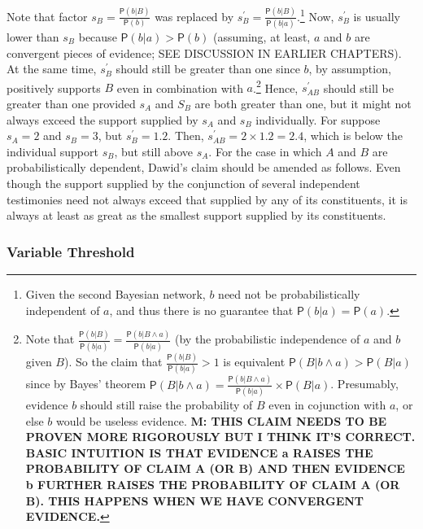 \documentclass[10pt,dvipsnames,enabledeprecatedfontcommands]{scrartcl}
\newcommand{\pr}[1]{\mathsf{P}(#1)}
\begin{document}
\noindent  Note that factor \(s_{B}= \frac{\pr{b |B}}{\pr{b}}\) was
replaced by
\(s^{'}_{B}=\frac{\pr{b |B}}{\pr{b|a}}\).\footnote{Given the second Bayesian network, 
$b$ need not be probabilistically independent of $a$, and thus there is no guarantee that 
$\pr{b \vert a}=\pr{a}$.} Now, \(s^{'}_{B}\) is usually lower than
\(s_{B}\) because \(\pr{b | a} > \pr{b}\) (assuming, at least, \(a\) and
\(b\) are convergent pieces of evidence; SEE DISCUSSION IN EARLIER
CHAPTERS). At the same time, \(s^{'}_{B}\) should still be greater than
one since \(b\), by assumption, positively supports \(B\) even in
combination with \(a\).\footnote{Note that 
$\frac{\pr{b |B}}{\pr{b|a}}=\frac{\pr{b |B \wedge a}}{\pr{b|a}}$ 
(by the probabilistic independence of $a$ and $b$ given $B$). 
So the claim that $\frac{\pr{b |B}}{\pr{b|a}}>1$ is 
equivalent $\pr{B | b \wedge a}> \pr{B|a}$ since by Bayes' theorem 
$\pr{B | b \wedge a} = \frac{\pr{b |B \wedge a}}{\pr{b|a}} \times \pr{B|a}$.
Presumably, evidence $b$ should still raise the probability of $B$ 
even in cojunction with $a$, or else $b$ would be useless evidence. \textbf{M: THIS CLAIM NEEDS 
TO BE PROVEN MORE RIGOROUSLY BUT I THINK IT'S CORRECT. BASIC INTUITION IS THAT EVIDENCE a 
RAISES THE PROBABILITY OF CLAIM A (OR B) AND THEN EVIDENCE 
b FURTHER RAISES THE PROBABILITY OF CLAIM A (OR B). THIS HAPPENS WHEN WE HAVE CONVERGENT 
EVIDENCE.}} Hence, \(s^{'}_{AB}\) should still be greater than one
provided \(s_A\) and \(S_B\) are both greater than one, but it might not
always exceed the support supplied by \(s_A\) and \(s_B\) individually.
For suppose \(s_A=2\) and \(s_B=3\), but \(s^{'}_B=1.2\). Then,
\(s^{'}_{AB}=2\times 1.2=2.4\), which is below the individual support
\(s_B\), but still above \(s_A\). For the case in which \(A\) and \(B\)
are probabilistically dependent, Dawid's claim should be amended as
follows. Even though the support supplied by the conjunction of several
independent testimonies need not always exceed that supplied by any of
its constituents, it is always at least as great as the smallest support
supplied by its
constituents.

\subsubsection{Variable Threshold}\label{variable-threshold}
\end{document}
